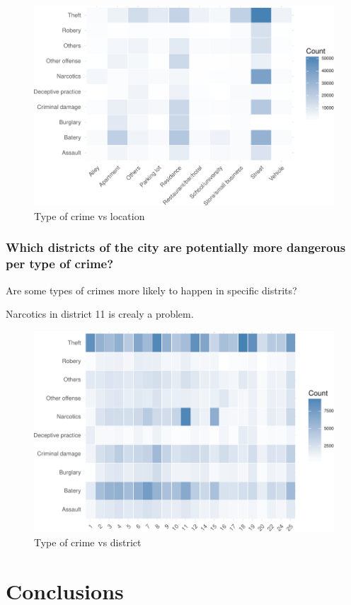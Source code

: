 \documentclass[]{article}
\begin{document}
\begin{figure}[H]

{\centering \includegraphics{Assessment_1v9_files/figure-latex/fig11-1} 

}

\caption{Type of crime vs location}\label{fig:fig11}
\end{figure}

\subsubsection{Which districts of the city are potentially more
dangerous per type of
crime?}\label{which-districts-of-the-city-are-potentially-more-dangerous-per-type-of-crime}

Are some types of crimes more likely to happen in specific distrits?

Narcotics in district 11 is crealy a problem.

\begin{figure}[H]

{\centering \includegraphics{Assessment_1v9_files/figure-latex/fig10-1} 

}

\caption{Type of crime vs district}\label{fig:fig10}
\end{figure}

\section{Conclusions}\label{conclusions}
\end{document}
